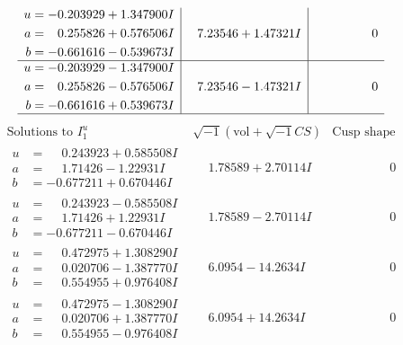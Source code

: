 \documentclass[1p]{elsarticle_modified}
\theoremstyle{definition}
\newcommand{\I}{\sqrt{-1}}
\begin{document}
$$\begin{array}{c|c|c}
\begin{aligned}
u &= -0.203929 + 1.347900 I \\
a &= \phantom{-}0.255826 + 0.576506 I \\
b &= -0.661616 - 0.539673 I\end{aligned}
 & \phantom{-}7.23546 + 1.47321 I & \phantom{-0.000000 } 0 \\ \hline\begin{aligned}
u &= -0.203929 - 1.347900 I \\
a &= \phantom{-}0.255826 - 0.576506 I \\
b &= -0.661616 + 0.539673 I\end{aligned}
 & \phantom{-}7.23546 - 1.47321 I & \phantom{-0.000000 } 0\\
 \hline 
 \end{array}$$\newpage$$\begin{array}{c|c|c}  
\text{Solutions to }I^u_{1}& \I (\text{vol} + \sqrt{-1}CS) & \text{Cusp shape}\\
 \hline 
\begin{aligned}
u &= \phantom{-}0.243923 + 0.585508 I \\
a &= \phantom{-}1.71426 - 1.22931 I \\
b &= -0.677211 + 0.670446 I\end{aligned}
 & \phantom{-}1.78589 + 2.70114 I & \phantom{-0.000000 } 0 \\ \hline\begin{aligned}
u &= \phantom{-}0.243923 - 0.585508 I \\
a &= \phantom{-}1.71426 + 1.22931 I \\
b &= -0.677211 - 0.670446 I\end{aligned}
 & \phantom{-}1.78589 - 2.70114 I & \phantom{-0.000000 } 0 \\ \hline\begin{aligned}
u &= \phantom{-}0.472975 + 1.308290 I \\
a &= \phantom{-}0.020706 - 1.387770 I \\
b &= \phantom{-}0.554955 + 0.976408 I\end{aligned}
 & \phantom{-}6.0954 - 14.2634 I & \phantom{-0.000000 } 0 \\ \hline\begin{aligned}
u &= \phantom{-}0.472975 - 1.308290 I \\
a &= \phantom{-}0.020706 + 1.387770 I \\
b &= \phantom{-}0.554955 - 0.976408 I\end{aligned}
 & \phantom{-}6.0954 + 14.2634 I & \phantom{-0.000000 } 0 \\ \hline\begin{aligned}

\end{aligned}
\end{array}$$
\end{document}
